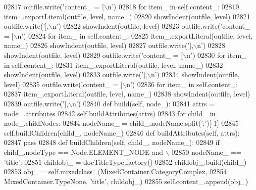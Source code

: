 \begin{DoxyCode}
{{{{{{{{{{{{{{{{{{{{{{{{{{{{{{{{{{{{{{{{{{{{{{{{{{{{{{{{{{{{{{{{{{{{{{{{{{{{{{{{{{{{{{{{{{{{{{{{{{{{{{{{{{{{{{{{{{{{{{{{{{{{{{{{{{{{{{{{{{{{{{{{{{{{{{{{{{{{{{{{{{{{{{{{{{{{{{{{{{{{{{{{{{{{{{{{{{{{{02817         outfile.write(\textcolor{stringliteral}{'content\_ = [\(\backslash\)n'})
02818         \textcolor{keywordflow}{for} item\_ \textcolor{keywordflow}{in} self.content\_:
02819             item\_.exportLiteral(outfile, level, name\_)
02820         showIndent(outfile, level)
02821         outfile.write(\textcolor{stringliteral}{'],\(\backslash\)n'})
02822         showIndent(outfile, level)
02823         outfile.write(\textcolor{stringliteral}{'content\_ = [\(\backslash\)n'})
02824         \textcolor{keywordflow}{for} item\_ \textcolor{keywordflow}{in} self.content\_:
02825             item\_.exportLiteral(outfile, level, name\_)
02826         showIndent(outfile, level)
02827         outfile.write(\textcolor{stringliteral}{'],\(\backslash\)n'})
02828         showIndent(outfile, level)
02829         outfile.write(\textcolor{stringliteral}{'content\_ = [\(\backslash\)n'})
02830         \textcolor{keywordflow}{for} item\_ \textcolor{keywordflow}{in} self.content\_:
02831             item\_.exportLiteral(outfile, level, name\_)
02832         showIndent(outfile, level)
02833         outfile.write(\textcolor{stringliteral}{'],\(\backslash\)n'})
02834         showIndent(outfile, level)
02835         outfile.write(\textcolor{stringliteral}{'content\_ = [\(\backslash\)n'})
02836         \textcolor{keywordflow}{for} item\_ \textcolor{keywordflow}{in} self.content\_:
02837             item\_.exportLiteral(outfile, level, name\_)
02838         showIndent(outfile, level)
02839         outfile.write(\textcolor{stringliteral}{'],\(\backslash\)n'})
02840     \textcolor{keyword}{def }build(self, node\_):
02841         attrs = node\_.attributes
02842         self.buildAttributes(attrs)
02843         \textcolor{keywordflow}{for} child\_ \textcolor{keywordflow}{in} node\_.childNodes:
02844             nodeName\_ = child\_.nodeName.split(\textcolor{stringliteral}{':'})[-1]
02845             self.buildChildren(child\_, nodeName\_)
02846     \textcolor{keyword}{def }buildAttributes(self, attrs):
02847         \textcolor{keywordflow}{pass}
02848     \textcolor{keyword}{def }buildChildren(self, child\_, nodeName\_):
02849         \textcolor{keywordflow}{if} child\_.nodeType == Node.ELEMENT\_NODE \textcolor{keywordflow}{and} \(\backslash\)
02850             nodeName\_ == \textcolor{stringliteral}{'title'}:
02851             childobj\_ = docTitleType.factory()
02852             childobj\_.build(child\_)
02853             obj\_ = self.mixedclass\_(MixedContainer.CategoryComplex,
02854                 MixedContainer.TypeNone, \textcolor{stringliteral}{'title'}, childobj\_)
02855             self.content\_.append(obj\_)
}}}}}}}}}}}}}}}}}}}}}}}}}}}}}}}}}}}}}}}}}}}}}}}}}}}}}}}}}}}}}}}}}}}}}}}}}}}}}}}}}}}}}}}}}}}}}}}}}}}}}}}}}}}}}}}}}}}}}}}}}}}}}}}}}}}}}}}}}}}}}}}}}}}}}}}}}}}}}}}}}}}}}}}}}}}}}}}}}}}}}}}}}}}}}}}}}}}}}
\end{DoxyCode}
